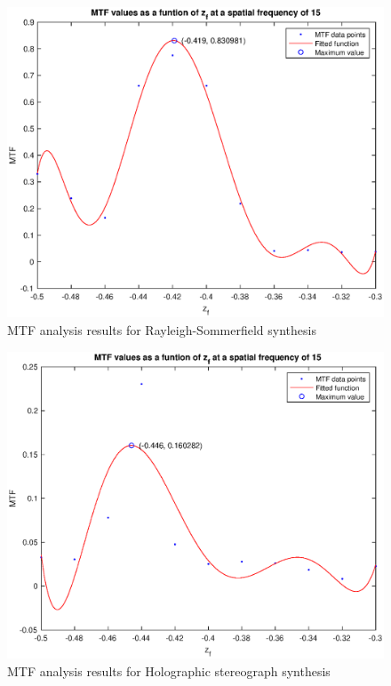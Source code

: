 \documentclass[12pt,a4paper,english
]{tunithesis}
\begin{document}
\begin{figure}
  \label{fig:mtf_rs}
  \centering
  \includegraphics[width=\columnwidth]{img/mtf_rs.eps}
  \caption{MTF analysis results for Rayleigh-Sommerfield synthesis}
\end{figure}

\begin{figure}
  \label{fig:mtf_hs}
  \centering
  \includegraphics[width=\columnwidth]{img/mtf_hs.eps}
  \caption{MTF analysis results for Holographic stereograph synthesis}
\end{figure}
\end{document}
